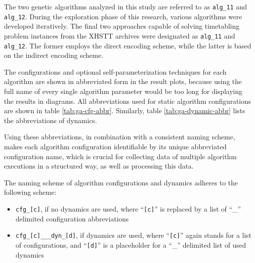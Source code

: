 \documentclass[english,examples]{isasthesis}
\begin{document}
The two genetic algorithms analyzed in this study are referred to as
\texttt{alg\_11} and \texttt{alg\_12}. During the exploration phase of this
research, various algorithms were developed iteratively. The final two
approaches capable of solving timetabling problem instances from the XHSTT
archives were designated as \texttt{alg\_11} and \texttt{alg\_12}.
The former employs the direct encoding scheme, while the latter is based on the
indirect encoding scheme.

The configurations and optional self-parameterization techniques for each
algorithm are shown in abbreviated form in the result plots, because using the
full name of every single algorithm parameter would be too long for displaying
the results in diagrams. All abbreviations used for static algorithm
configurations are shown in table \ref{tab:ga-cfg-abbr}. Similarly, table
\ref{tab:ga-dynamic-abbr} lists the abbreviations of dynamics.

\begin{table}[h!]
    
\end{table}

\begin{table}[h!]
    
\end{table}

Using these abbreviations, in combination with a consistent naming scheme,
makes each algorithm configuration identifiable by its unique abbreviated
configuration name, which is crucial for collecting data of multiple
algorithm executions in a structured way, as well as processing this data.

The naming scheme of algorithm configurations and dynamics adheres to the
following scheme:
\begin{itemize}
    \item   \texttt{cfg\_[c]}, if no dynamics are used, where
            \enquote{\texttt{[c]}} is replaced by a list of \enquote{\_}
            delimited configuration abbreviations

    \item   \texttt{cfg\_[c]\_\_\_dyn\_[d]}, if dynamics are used, where
            \enquote{\texttt{[c]}} again stands for a list of configurations,
            and \enquote{\texttt{[d]}} is a placeholder for a \enquote{\_}
            delimited list of used dynamics
\end{itemize}


\end{document}
